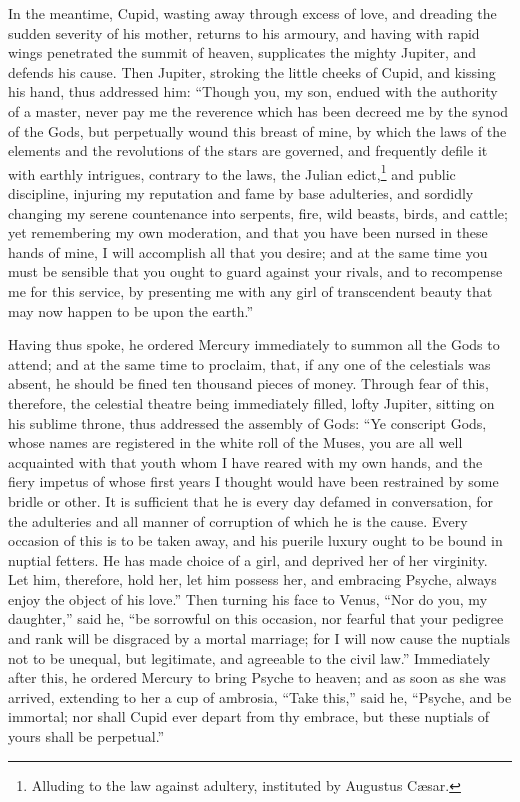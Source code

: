 \documentclass{article}
\begin{document}
In the meantime, Cupid, wasting away through excess of love, and dreading the
sudden severity of his mother, returns to his armoury, and having with rapid
wings penetrated the summit of heaven, supplicates the mighty Jupiter, and
defends his cause. Then Jupiter, stroking the little cheeks of Cupid, and
kissing his hand, thus addressed him: ``Though you, my son, endued with the
authority of a master, never pay me the reverence which has been decreed me by
the synod of the Gods, but perpetually wound this breast of mine, by which the
laws of the elements and the revolutions of the stars are governed, and
frequently defile it with earthly intrigues, contrary to the laws, the Julian
edict,\footnote{Alluding to the law against adultery, instituted by Augustus
C{\ae}sar.} and public discipline, injuring my reputation and fame by base
adulteries, and sordidly changing my serene countenance into serpents, fire,
wild beasts, birds, and cattle; yet remembering my own moderation, and that you
have been nursed in these hands of mine, I will accomplish all that you desire;
and at the same time you must be sensible that you ought to guard against your
rivals, and to recompense me for this service, by presenting me with any girl
of transcendent beauty that may now happen to be upon the earth.''

Having thus spoke, he ordered Mercury immediately to summon all the Gods to
attend; and at the same time to proclaim, that, if any one of the celestials
was absent, he should be fined ten thousand pieces of money. Through fear of
this, therefore, the celestial theatre being immediately filled, lofty Jupiter,
sitting on his sublime throne, thus addressed the assembly of Gods: ``Ye
conscript Gods, whose names are registered in the white roll of the Muses, you
are all well acquainted with that youth whom I have reared with my own hands,
and the fiery impetus of whose first years I thought would have been restrained
by some bridle or other. It is sufficient that he is every day defamed in
conversation, for the adulteries and all manner of corruption of which he is
the cause. Every occasion of this is to be taken away, and his puerile luxury
ought to be bound in nuptial fetters. He has made choice of a girl, and
deprived her of her virginity. Let him, therefore, hold her, let him possess
her, and embracing Psyche, always enjoy the object of his love.'' Then turning
his face to Venus, ``Nor do you, my daughter,'' said he, ``be sorrowful on this
occasion, nor fearful that your pedigree and rank will be disgraced by a mortal
marriage; for I will now cause the nuptials not to be unequal, but legitimate,
and agreeable to the civil law.'' Immediately after this, he ordered Mercury to
bring Psyche to heaven; and as soon as she was arrived, extending to her a cup
of ambrosia, ``Take this,'' said he, ``Psyche, and be immortal; nor shall Cupid
ever depart from thy embrace, but these nuptials of yours shall be perpetual.''
\end{document}
